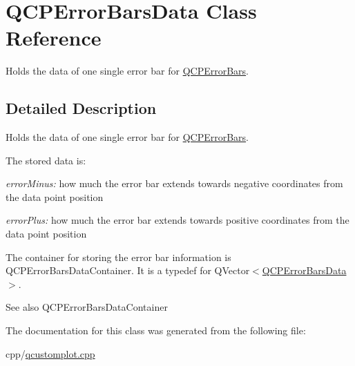 \hypertarget{class_q_c_p_error_bars_data}{}\section{Q\+C\+P\+Error\+Bars\+Data Class Reference}
\label{class_q_c_p_error_bars_data}


Holds the data of one single error bar for \mbox{\hyperlink{class_q_c_p_error_bars}{Q\+C\+P\+Error\+Bars}}.  




\subsection{Detailed Description}
Holds the data of one single error bar for \mbox{\hyperlink{class_q_c_p_error_bars}{Q\+C\+P\+Error\+Bars}}. 

The stored data is\+: \begin{DoxyItemize}
\item {\itshape error\+Minus\+:} how much the error bar extends towards negative coordinates from the data point position \item {\itshape error\+Plus\+:} how much the error bar extends towards positive coordinates from the data point position\end{DoxyItemize}
The container for storing the error bar information is Q\+C\+P\+Error\+Bars\+Data\+Container. It is a typedef for {\ttfamily Q\+Vector$<$\mbox{\hyperlink{class_q_c_p_error_bars_data}{Q\+C\+P\+Error\+Bars\+Data}}$>$}.

\begin{DoxySeeAlso}{See also}
Q\+C\+P\+Error\+Bars\+Data\+Container 
\end{DoxySeeAlso}


The documentation for this class was generated from the following file\+:\begin{DoxyCompactItemize}
\item 
cpp/\mbox{\hyperlink{qcustomplot_8cpp}{qcustomplot.\+cpp}}\end{DoxyCompactItemize}
